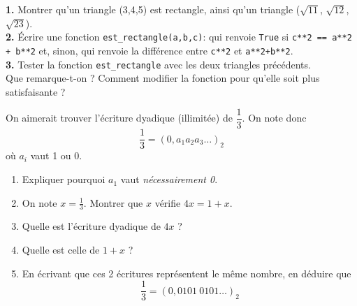 \begin{exercice}

    \textbf{1.}	Montrer qu'un triangle (3,4,5) est rectangle, ainsi qu'un triangle ($\sqrt{11}$, $\sqrt{12}$, $\sqrt{23}$).\\

    \textbf{2.} \'Ecrire une fonction \texttt{est_rectangle(a,b,c)}: qui renvoie \texttt{True} si \texttt{c**2 == a**2 + b**2} et, sinon, qui renvoie la différence
    entre \texttt{c**2} et \texttt{a**2+b**2}.\\

    \textbf{3.} Tester la fonction \texttt{est_rectangle} avec les deux triangles précédents.\\
    Que remarque-t-on ? Comment modifier la fonction pour qu'elle soit plus satisfaisante ?
\end{exercice}

\begin{exercice}[**]
    On aimerait trouver l'écriture dyadique (illimitée) de $\dfrac{1}{3}$.
    On note donc $$\dfrac{1}{3}=(0,a_1a_2a_3\ldots)_2$$
    où $a_i$ vaut 1 ou 0.
    \begin{enumerate}
        \item 	Expliquer pourquoi $a_1$ vaut \textit{nécessairement 0}.
        \item 	On note $x=\frac{1}{3}$. Montrer que $x$ vérifie $4x=1+x$.
        \item 	Quelle est l'écriture dyadique de $4x$ ?
        \item 	Quelle est celle de $1+x$ ?
        \item 	En écrivant que ces 2 écritures représentent le même nombre, en déduire que $$\dfrac{1}{3}=(0,0101\ 0101\ldots )_2$$
    \end{enumerate}
\end{exercice}
